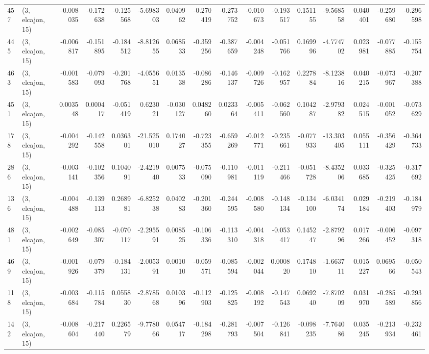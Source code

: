 \begin{tabular}{llrrrrrrrrrrrrrr}
457 &  (3, elcajon, 15) &  -0.008035 & -0.172638 & -0.125568 &    -5.698303 &   0.040962 &  -0.270419 &  -0.273752 & -0.010673 & -0.193517 &  0.151155 &   -9.568558 &  0.040401 & -0.259680 & -0.296598 \\
445 &  (3, elcajon, 15) &  -0.006817 & -0.151895 & -0.184512 &    -8.812655 &   0.068533 &  -0.359256 &  -0.387659 & -0.004248 & -0.051766 &  0.169996 &   -4.774702 &  0.023981 & -0.077885 & -0.155754 \\
463 &  (3, elcajon, 15) &  -0.001583 & -0.079093 & -0.201768 &    -4.055651 &   0.013538 &  -0.086286 &  -0.146137 & -0.009726 & -0.162957 &  0.227884 &   -8.123816 &  0.040215 & -0.073967 & -0.207388 \\
451 &  (3, elcajon, 15) &   0.003548 &  0.000417 & -0.051419 &     0.623021 &  -0.030127 &   0.048260 &   0.023364 & -0.005411 & -0.062560 &  0.104287 &   -2.979382 &  0.024515 & -0.001052 & -0.073629 \\
178 &  (3, elcajon, 15) &  -0.004292 & -0.142558 &  0.036301 &   -21.525010 &   0.174027 &  -0.723355 &  -0.659269 & -0.012771 & -0.235661 & -0.077933 &  -13.303405 &  0.055111 & -0.356429 & -0.364733 \\
286 &  (3, elcajon, 15) &  -0.003141 & -0.102356 &  0.104091 &    -2.421940 &   0.007533 &  -0.075090 &  -0.110981 & -0.011119 & -0.211466 & -0.051728 &   -8.435206 &  0.033685 & -0.325425 & -0.317692 \\
136 &  (3, elcajon, 15) &  -0.004488 & -0.139113 &  0.268981 &    -6.825238 &   0.040283 &  -0.201360 &  -0.244595 & -0.008580 & -0.148134 & -0.134100 &   -6.034174 &  0.029184 & -0.219403 & -0.184979 \\
481 &  (3, elcajon, 15) &  -0.002649 & -0.085307 & -0.070117 &    -2.295591 &   0.008525 &  -0.106336 &  -0.113310 & -0.004318 & -0.053417 &  0.145247 &   -2.879296 &  0.017266 & -0.006452 & -0.097318 \\
469 &  (3, elcajon, 15) &  -0.001926 & -0.079379 & -0.184131 &    -2.005391 &   0.001010 &  -0.059571 &  -0.085594 & -0.002044 &  0.000820 &  0.174810 &   -1.663711 &  0.015227 &  0.069566 & -0.050543 \\
118 &  (3, elcajon, 15) &  -0.003684 & -0.115784 &  0.055830 &    -2.878568 &   0.010396 &  -0.112903 &  -0.125825 & -0.008192 & -0.147543 &  0.069240 &   -7.870209 &  0.031970 & -0.285589 & -0.293856 \\
142 &  (3, elcajon, 15) &  -0.008604 & -0.217440 &  0.226579 &    -9.778066 &   0.054717 &  -0.184298 &  -0.281793 & -0.007504 & -0.126841 & -0.098235 &   -7.764086 &  0.035245 & -0.213934 & -0.232461 \\

\end{tabular}
